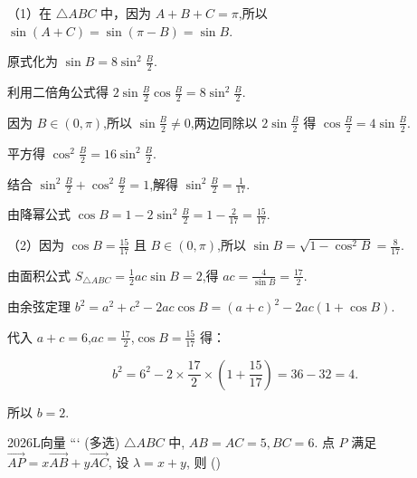 \documentclass[12pt,UTF-8,a4paper]{ctexart}
\numberwithin{figure}{section}
\theoremstyle{mystyle}
\theoremstyle{mystylekaishu}
\theoremstyle{mystyle}
\numberwithin{xiti}{section}
\begin{document}
\begin{solutions}
（1）在 $\triangle ABC$ 中，因为 $A+B+C=\pi$,所以 $\sin(A+C)=\sin(\pi-B)=\sin B$.

原式化为 $\sin B=8\sin^2\frac{B}{2}$.

利用二倍角公式得 $2\sin\frac{B}{2}\cos\frac{B}{2}=8\sin^2\frac{B}{2}$.

因为 $B\in(0,\pi)$,所以 $\sin\frac{B}{2}\neq 0$,两边同除以 $2\sin\frac{B}{2}$ 得 $\cos\frac{B}{2}=4\sin\frac{B}{2}$.

平方得 $\cos^2\frac{B}{2}=16\sin^2\frac{B}{2}$.

结合 $\sin^2\frac{B}{2}+\cos^2\frac{B}{2}=1$,解得 $\sin^2\frac{B}{2}=\displaystyle\frac{1}{17}$.

由降幂公式 $\cos B=1-2\sin^2\frac{B}{2}=1-\displaystyle\frac{2}{17}=\displaystyle\frac{15}{17}$.

（2）因为 $\cos B=\displaystyle\frac{15}{17}$ 且 $B\in(0,\pi)$,所以 $\sin B=\sqrt{1-\cos^2 B}=\displaystyle\frac{8}{17}$.

由面积公式 $S_{\triangle ABC}=\displaystyle\frac{1}{2}ac\sin B=2$,得 $ac=\displaystyle\frac{4}{\sin B}=\displaystyle\frac{17}{2}$.

由余弦定理 $b^2=a^2+c^2-2ac\cos B=(a+c)^2-2ac(1+\cos B)$.

代入 $a+c=6$,$ac=\displaystyle\frac{17}{2}$,$\cos B=\displaystyle\frac{15}{17}$ 得：

$$
b^2=6^2-2\times\displaystyle\frac{17}{2}\times\left(1+\displaystyle\frac{15}{17}\right)=36-32=4.
$$

所以 $b=\boxed{2}$.
\end{solutions}


\begin{problem}{2026}{L}{}{}{向量}
```
(多选) $\triangle ABC$ 中, $AB=AC=5, BC=6$. 点 $P$ 满足 $\overrightarrow{AP}=x \overrightarrow{AB}+y \overrightarrow{AC}$, 设 $\lambda=x+y$, 则 (\hspace{1cm})
\begin{choices}
\end{choices}
\end{problem}
\end{document}
